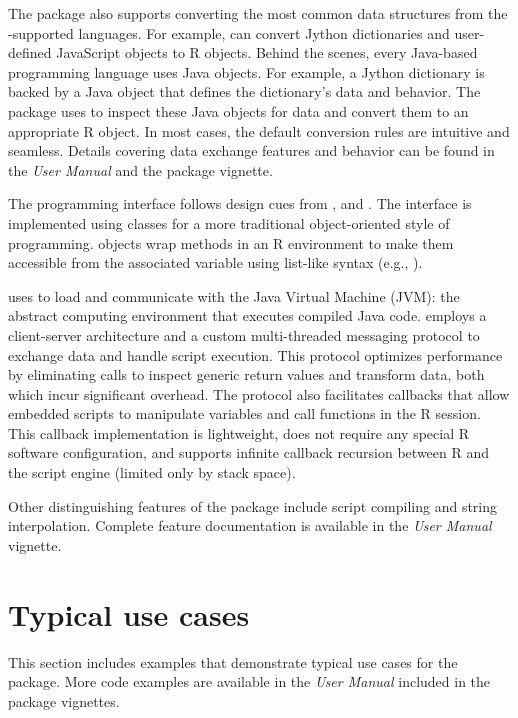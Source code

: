 The  package also supports converting the most common data structures from the -supported languages. For example,  can convert Jython dictionaries and user-defined JavaScript objects to R objects. Behind the scenes, every Java-based programming language uses Java objects. For example, a Jython dictionary is backed by a Java object that defines the dictionary's data and behavior. The  package uses  to inspect these Java objects for data and convert them to an appropriate R object. In most cases, the default conversion rules are intuitive and seamless. Details covering data exchange features and behavior can be found in the \textit{ User Manual} and the  package vignette.

The  programming interface follows design cues from , and  \citep{v8pkg}. The interface is implemented using  \citep{r6} classes for a more traditional object-oriented style of programming.  objects wrap methods in an R environment to make them accessible from the associated variable using list-like syntax (e.g., ).

 uses  to load and communicate with the Java Virtual Machine (JVM): the abstract computing environment that executes compiled Java code.  employs a client-server architecture and a custom multi-threaded messaging protocol to exchange data and handle script execution. This protocol optimizes performance by eliminating  calls to inspect generic return values and transform data, both which incur significant overhead. The protocol also facilitates callbacks that allow embedded scripts to manipulate variables and call functions in the R session. This callback implementation is lightweight, does not require any special R software configuration, and supports infinite callback recursion between R and the script engine (limited only by stack space).

Other distinguishing features of the  package include script compiling and string interpolation. Complete feature documentation is available in the \textit{ User Manual} vignette.

\hypertarget{typical-use-cases}{}
\section{Typical use cases}

This section includes examples that demonstrate typical use cases for the  package. More code examples are available in the \textit{ User Manual} included in the package vignettes.

